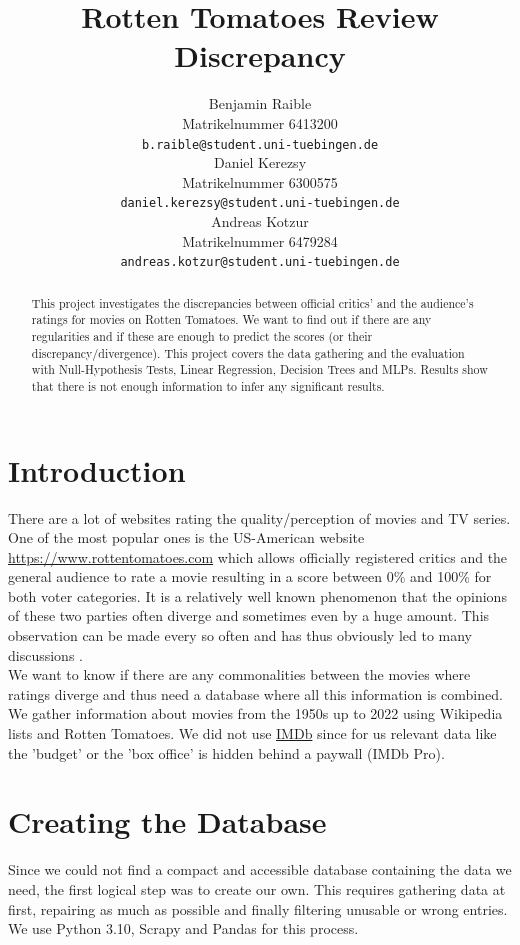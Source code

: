 \documentclass{article}
\title{Rotten Tomatoes Review Discrepancy}
\author{%
  Benjamin Raible\\
  Matrikelnummer 6413200\\
  \texttt{b.raible@student.uni-tuebingen.de} \\
  \And
  Daniel Kerezsy\\
  Matrikelnummer 6300575\\
  \texttt{daniel.kerezsy@student.uni-tuebingen.de} \\
  \And
  Andreas Kotzur\\
  Matrikelnummer 6479284\\
  \texttt{andreas.kotzur@student.uni-tuebingen.de} \\
}
\begin{document}
\maketitle
\begin{abstract}
    This project investigates the discrepancies between official critics' and the audience's ratings for movies on Rotten Tomatoes. We want to find out if there are any regularities and if these are enough to predict the scores (or their discrepancy/divergence). This project covers the data gathering and the evaluation with Null-Hypothesis Tests, Linear Regression, Decision Trees and MLPs. Results show that there is not enough information to infer any significant results.
\end{abstract}

\section{Introduction}
    There are a lot of websites rating the quality/perception of movies and TV series. One of the most popular ones is the US-American website \href{https://www.rottentomatoes.com}{https://www.rottentomatoes.com} \cite{rotten_about} which allows officially registered critics and the general audience to rate a movie resulting in a score between 0\% and 100\% for both voter categories. It is a relatively well known phenomenon that the opinions of these two parties often diverge and sometimes even by a huge amount. This observation can be made every so often and has thus obviously led to many discussions \cite{looper_divides}\cite{reddit_divide_1}\cite{reddit_divide_2}.\\
    We want to know if there are any commonalities between the movies where ratings diverge and thus need a database where all this information is combined.  
    We gather information about movies from the 1950s up to 2022 using Wikipedia lists and Rotten Tomatoes. We did not use \href{https://www.imdb.com/}{IMDb} since for us relevant data like the 'budget' or the 'box office' is hidden behind a paywall (IMDb Pro).

\section{Creating the Database}
    Since we could not find a compact and accessible database containing the data we need, the first logical step was to create our own. This requires gathering data at first, repairing as much as possible and finally filtering unusable or wrong entries.\\
    We use Python 3.10, Scrapy and Pandas for this process.
\end{document}

